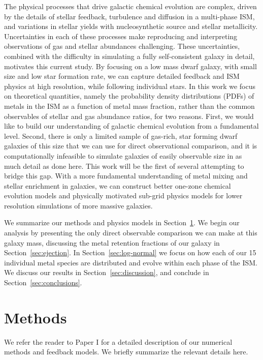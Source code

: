 The physical processes that drive galactic chemical evolution are complex, driven by the details of stellar feedback, turbulence and diffusion in a multi-phase ISM, and variations in stellar yields with nucleosynthetic source and stellar metallicity. Uncertainties in each of these processes make reproducing and interpreting observations of gas and stellar abundances challenging. 
These uncertainties, combined with the difficulty in simulating a fully self-consistent galaxy in detail, motivates this current study. By focusing on a low mass dwarf galaxy, with small size and low star formation rate, we can capture detailed feedback and ISM physics at high resolution, while following individual stars. In this work we focus on theoretical quantities, namely the probability density distributions (PDFs) of metals in the ISM as a function of metal mass fraction, rather than the common observables of stellar and gas abundance ratios, for two reasons. First, we would like to build our understanding of galactic chemical evolution from a fundamental level. Second, there is only a limited sample of gas-rich, star forming dwarf galaxies of this size that we can use for direct observational comparison, and it is computationally infeasible to simulate galaxies of easily observable size in as much detail as done here. This work will be the first of several attempting to bridge this gap. With a more fundamental understanding of metal mixing and stellar enrichment in galaxies, we can construct better one-zone chemical evolution models and physically motivated sub-grid physics models for lower resolution simulations of more massive galaxies.

We summarize our methods and physics models in Section~\ref{sec:methods}. We begin our analysis by presenting the only direct observable comparison we can make at this galaxy mass, discussing the metal retention fractions of our galaxy in Section~\ref{sec:ejection}. In Section~\ref{sec:log-normal} we focus on how each of our 15 individual metal species are distributed and evolve within each phase of the ISM. We discuss our results in Section~\ref{sec:discussion}, and conclude in Section~\ref{sec:conclusions}.

\section{Methods}
\label{sec:methods}
We refer the reader to Paper I for a detailed description of our numerical methods and feedback models. We briefly summarize the relevant details here.

